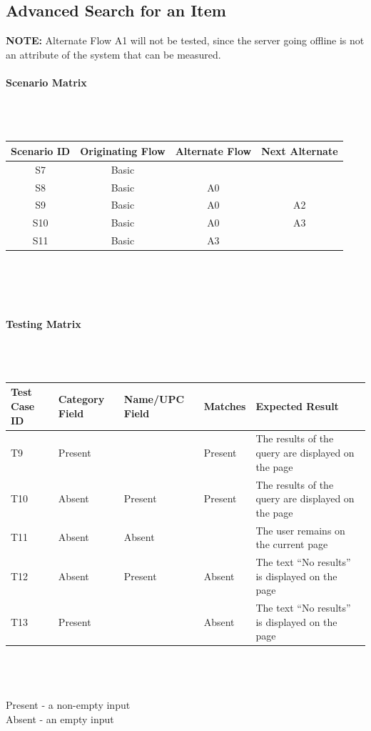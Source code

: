 \documentclass{article}
\begin{document}
\subsection{Advanced Search for an Item}
\textbf{NOTE:} Alternate Flow A1 will not be tested, since the server going offline is not an attribute of the system that can be measured.

\paragraph{Scenario Matrix}~\\ \\
\begin{tabular}{ c  c  c  c }
\hline
Scenario ID & Originating Flow & Alternate Flow & Next Alternate \\
\hline
\hline
S7 & Basic &  & \\
\hline
S8 & Basic & A0 & \\
\hline
S9 & Basic & A0 & A2 \\
\hline
S10 & Basic & A0 & A3 \\
\hline
S11 & Basic & A3 &  \\
\hline
\end{tabular}\\
~\\
~\\
\paragraph{Testing Matrix}~\\ \\
\begin{tabular}{ p{0.8in}  p{0.5in} p{0.7in}  p{0.5in}  p{3in} }
\hline
Test Case ID & Category Field & Name/UPC Field & Matches & Expected Result\\
\hline
\hline
T9 & Present &  & Present & The results of the query are displayed on the page\\
\hline
T10 & Absent & Present & Present & The results of the query are displayed on the page\\
\hline
T11 & Absent & Absent &  & The user remains on the current page\\
\hline
T12 & Absent & Present & Absent & The text ``No results'' is displayed on the page\\
\hline
T13 & Present &  & Absent & The text ``No results'' is displayed on the page\\
\hline
\end{tabular}\\
~\\
~\\
Present - a non-empty input\\
Absent - an empty input
\end{document}
